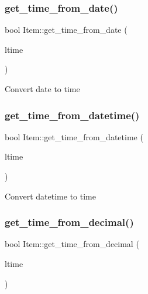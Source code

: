 \mbox{\label{classItem_a55b105713447a5934c07cfff39001898}} 
\subsubsection{\texorpdfstring{get\+\_\+time\+\_\+from\+\_\+date()}{get\_time\_from\_date()}}
{\footnotesize\ttfamily bool Item\+::get\+\_\+time\+\_\+from\+\_\+date (\begin{DoxyParamCaption}\item[{M\+Y\+S\+Q\+L\+\_\+\+T\+I\+ME $\ast$}]{ltime }\end{DoxyParamCaption})\hspace{0.3cm}{\ttfamily [protected]}}

Convert date to time \mbox{\label{classItem_a3b6eb99fbb257de09b1fcddb73bc3142}} 
\subsubsection{\texorpdfstring{get\+\_\+time\+\_\+from\+\_\+datetime()}{get\_time\_from\_datetime()}}
{\footnotesize\ttfamily bool Item\+::get\+\_\+time\+\_\+from\+\_\+datetime (\begin{DoxyParamCaption}\item[{M\+Y\+S\+Q\+L\+\_\+\+T\+I\+ME $\ast$}]{ltime }\end{DoxyParamCaption})\hspace{0.3cm}{\ttfamily [protected]}}

Convert datetime to time \mbox{\label{classItem_a099dd8c794d94ac482747e34e4f7a6b3}} 
\subsubsection{\texorpdfstring{get\+\_\+time\+\_\+from\+\_\+decimal()}{get\_time\_from\_decimal()}}
{\footnotesize\ttfamily bool Item\+::get\+\_\+time\+\_\+from\+\_\+decimal (\begin{DoxyParamCaption}\item[{M\+Y\+S\+Q\+L\+\_\+\+T\+I\+ME $\ast$}]{ltime }\end{DoxyParamCaption})\hspace{0.3cm}{\ttfamily [protected]}}

